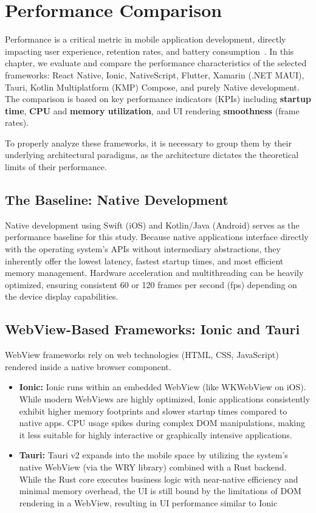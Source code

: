 \chapter{Performance Comparison}
\label{chap:performance}

Performance is a critical metric in mobile application development, directly impacting user experience, retention rates, and battery consumption~\cite{PF:01}. In this chapter, we evaluate and compare the performance characteristics of the selected frameworks: React Native, Ionic, NativeScript, Flutter, Xamarin (.NET MAUI), Tauri, Kotlin Multiplatform (KMP) Compose, and purely Native development. The comparison is based on key performance indicators (KPIs) including \textbf{startup time}, \textbf{CPU} and \textbf{memory utilization}, and UI rendering \textbf{smoothness} (frame rates).

To properly analyze these frameworks, it is necessary to group them by their underlying architectural paradigms, as the architecture dictates the theoretical limits of their performance.

\section{The Baseline: Native Development}
Native development using Swift (iOS) and Kotlin/Java (Android) serves as the performance baseline for this study. Because native applications interface directly with the operating system's APIs without intermediary abstractions, they inherently offer the lowest latency, fastest startup times, and most efficient memory management. Hardware acceleration and multithreading can be heavily optimized, ensuring consistent 60 or 120 frames per second (fps) depending on the device display capabilities.

\section{WebView-Based Frameworks: Ionic and Tauri}
WebView frameworks rely on web technologies (HTML, CSS, JavaScript) rendered inside a native browser component. 
\begin{itemize}
    \item \textbf{Ionic:} Ionic runs within an embedded WebView (like WKWebView on iOS). While modern WebViews are highly optimized, Ionic applications consistently exhibit higher memory footprints and slower startup times compared to native apps. CPU usage spikes during complex DOM manipulations, making it less suitable for highly interactive or graphically intensive applications. \cite{PF:02}
    \item \textbf{Tauri:} Tauri v2 expands into the mobile space by utilizing the system's native WebView (via the WRY library) combined with a Rust backend. While the Rust core executes business logic with near-native efficiency and minimal memory overhead, the UI is still bound by the limitations of DOM rendering in a WebView, resulting in UI performance similar to Ionic
\end{itemize}

